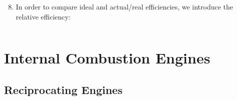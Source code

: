 \documentclass[10pt,compress]{beamer}
\begin{document}
\begin{frame}
\begin{columns}
\begin{column}[c]{0.5\linewidth}
{\begin{figure}
\begin{center}
         \end{center}
       \end{figure}} 
       \begin{enumerate}\setcounter{enumi}{7} \scriptsize
          \item<8-> In order to compare ideal and actual/real efficiencies, we introduce the relative efficiency:
       \end{enumerate}
     \end{column}   
  \end{columns}  
\end{frame}


\section{Internal Combustion Engines}

\subsection{Reciprocating Engines}
\end{document}

